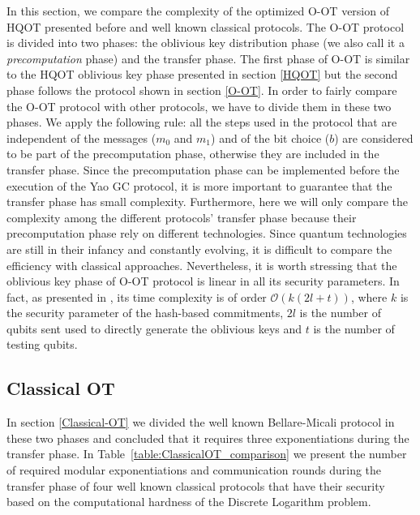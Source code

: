 In this section, we compare the complexity of the optimized O-OT version of HQOT presented before and well known classical protocols. The O-OT protocol is divided into two phases: the oblivious key distribution phase (we also call it a \textit{precomputation} phase) and the transfer phase. The first phase of O-OT is similar to the HQOT oblivious key phase \cite{Lemus20} presented in section \ref{HQOT} but the second phase follows the protocol shown in section \ref{O-OT}. In order to fairly compare the O-OT protocol with other protocols, we have to divide them in these two phases. We apply the following rule: all the steps used in the protocol that are independent of the messages ($m_0$ and $m_1$) and of the bit choice ($b$) are considered to be part of the precomputation phase, otherwise they are included in the transfer phase. Since the precomputation phase can be implemented before the execution of the Yao GC protocol, it is more important to guarantee that the transfer phase has small complexity. Furthermore, here we will only compare the complexity among the different protocols' transfer phase because their precomputation phase rely on different technologies. Since quantum technologies are still in their infancy and constantly evolving, it is difficult to compare the efficiency with classical approaches. Nevertheless, it is worth stressing that the oblivious key phase of O-OT protocol is linear in all its security parameters. In fact, as presented in \cite{Lemus20}, its time complexity is of order $\mathcal{O}(k(2l + t))$, where $k$ is the security parameter of the hash-based commitments, $2l$ is the number of qubits sent used to directly generate the oblivious keys and $t$ is the number of testing qubits.

\subsection{Classical OT} \label{C-OT_comp}

In section \ref{Classical-OT} we divided the well known Bellare-Micali protocol in these two phases and concluded that it requires three exponentiations during the transfer phase. In Table~\ref{table:ClassicalOT_comparison} we present the number of required modular exponentiations and communication rounds during the transfer phase of four well known classical protocols that have their security based on the computational hardness of the Discrete Logarithm problem. 

